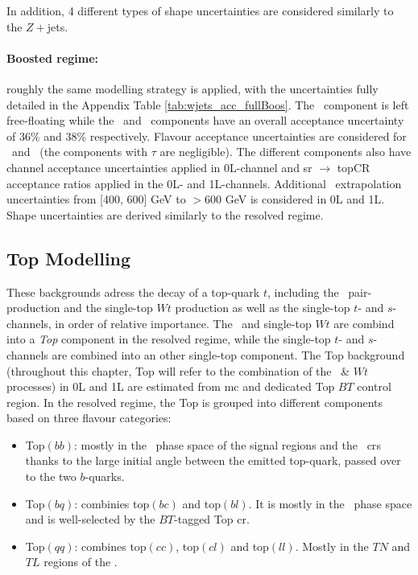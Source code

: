 In addition, 4 different types of shape uncertainties are considered similarly to the $Z+$jets.

\paragraph{Boosted regime:} roughly the same modelling strategy is applied, with the uncertainties fully detailed in the Appendix Table \ref{tab:wjets_acc_fullBoos}. The \whf\ component is left free-floating while the \wmf\ and \wlf\ components have an overall acceptance uncertainty of 36\% and 38\% respectively. Flavour acceptance uncertainties are considered for \whf\ and \wmf\ (the components with $\tau$ are negligible). The different components also have channel acceptance uncertainties applied in 0L-channel and \gls{sr} $\rightarrow$ topCR acceptance ratios applied in the 0L- and 1L-channels. Additional \ptv\ extrapolation uncertainties from [400, 600] GeV to $> 600$ GeV is considered in 0L and 1L. Shape uncertainties are derived similarly to the resolved regime. 

\subsection{Top Modelling}\label{sec-modTop} %
These backgrounds adress the decay of a top-quark $t$, including the \ttb\ pair-production and the single-top $Wt$ production as well as the single-top $t$- and $s$-channels, in order of relative importance. The \ttb\ and single-top $Wt$ are combind into a \textit{Top} component in the resolved regime, while the single-top $t$- and $s$-channels are combined into an other single-top component. The Top background (throughout this chapter, Top will refer to the combination of the \ttb\ \& $Wt$ processes) in 0L and 1L are estimated from \gls{mc} and dedicated Top $BT$ control region. In the resolved regime, the Top is grouped into different components based on three flavour categories:
\begin{itemize}
    \item Top$(bb)$: mostly in the \vhb\ phase space of the signal regions and the \highdr\ \gls{cr}s thanks to the large initial angle between the emitted top-quark, passed over to the two $b$-quarks.
    \item Top$(bq)$: combinies top$(bc)$ and top$(bl)$. It is mostly in the \vhc\ phase space and is well-selected by the $BT$-tagged Top \gls{cr}.
    \item Top$(qq)$: combines top$(cc)$, top$(cl)$ and top$(ll)$. Mostly in the $TN$ and $TL$ regions of the \vhc.
\end{itemize}

